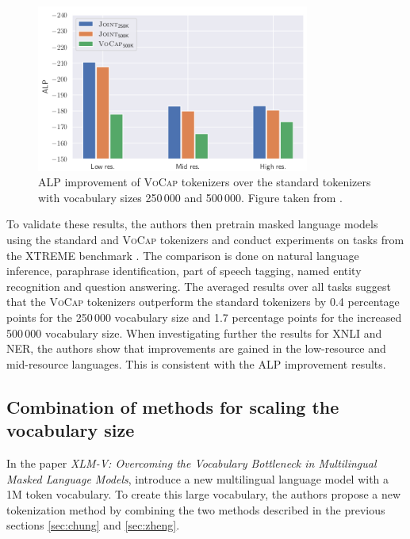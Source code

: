 \begin{figure}
    \centering
    \includegraphics[width=0.8\textwidth]{img/temp/alp_improvement.png}
    \caption{ALP improvement of \textsc{VoCap} tokenizers over the standard tokenizers with vocabulary sizes 250\,000 and 500\,000. Figure taken from \cite{zheng_allocating_2021}.}
    \label{fig:alp_improvement}
\end{figure}

To validate these results, the authors then pretrain masked language models using the standard and \textsc{VoCap} tokenizers and conduct experiments on tasks from the XTREME benchmark \cite{hu_xtreme_nodate}. The comparison is done on natural language inference, paraphrase identification, part of speech tagging, named entity recognition and question answering. The averaged results over all tasks suggest that the \textsc{VoCap} tokenizers outperform the standard tokenizers by 0.4 percentage points for the 250\,000 vocabulary size and 1.7 percentage points for the increased 500\,000 vocabulary size. When investigating further the results for XNLI and NER, the authors show that improvements are gained in the low-resource and mid-resource languages. This is consistent with the ALP improvement results.



\subsection{Combination of methods for scaling the vocabulary size}

In the paper \textit{XLM-V: Overcoming the Vocabulary Bottleneck in Multilingual Masked Language Models}, \citeauthor{liang_xlm-v_2023} introduce a new multilingual language model with a 1M token vocabulary. To create this large vocabulary, the authors propose a new tokenization method by combining the two methods described in the previous sections \ref{sec:chung} and \ref{sec:zheng}. 

